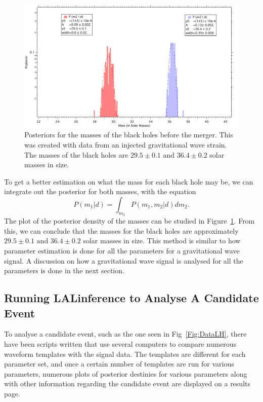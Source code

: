 \documentclass{article}
\begin{document}
     \begin{figure}[h]
     	\centering
     	\includegraphics[width=1\textwidth]{Figures/MassPost.pdf} 
     	\caption{Posteriors for the masses of the black holes before the  merger. This was created with data from an injected gravitational wave strain. The masses  of the black holes are $29.5\pm0.1 \text{ and } 36.4\pm0.2$ solar masses in size.}
     	\label{Fig:1Dmasses}
     \end{figure}
 
 
 To get a better estimation on what the mass for each black hole may be, we can integrate out the posterior for both masses, with the equation $$P(m_1|d)= \int_{m_2} {P(m_1, m_2 | d) dm_2}.$$ The plot of the posterior density of the masses can be studied in Figure~\ref{Fig:1Dmasses}. From this, we can conclude that the masses for the black holes are approximately $29.5\pm0.1 \text{ and } 36.4\pm0.2$ solar masses in size. This method is similar to how parameter estimation is done for all the parameters for a gravitational wave signal. A discussion on how a gravitational wave signal is analysed for all the parameters is done in the next section.\\
 
 
 \subsection{Running LALinference to Analyse A Candidate Event}
 
 To analyse a candidate event, such as the one seen in Fig~\ref{Fig:DataLH}, there have been scripts written that use several computers to compare numerous waveform templates with the signal data. The templates are different for each parameter set, and once a certain number of templates are run for various parameters, numerous plots of posterior destinies for various parameters along with other information regarding the candidate event are displayed on a results page. \\
 
\end{document}
